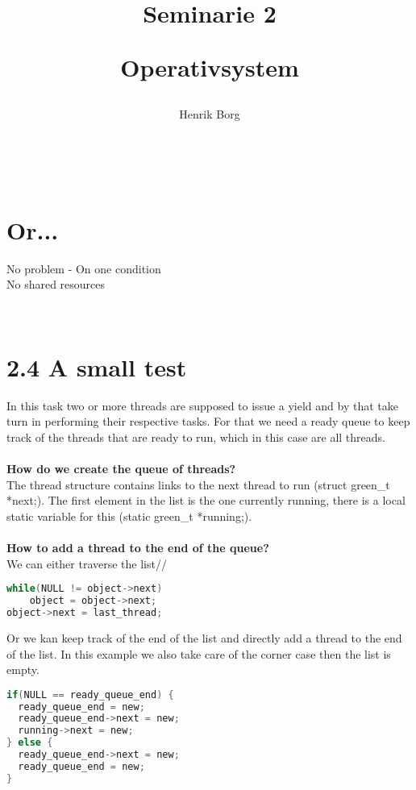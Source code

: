 \documentclass[10pt,a4paper]{article}
\title{{\HUGE Seminarie 2}\\ \begin{Large}
Operativsystem
\end{Large}}
\author{Henrik Borg}
\begin{document}
\maketitle
\begin{center}
\\[5\baselineskip]
\section*{Or...}
No problem - On one condition\\
No shared resources\\
\end{center}

\pagebreak\\


\section*{2.4 A small test}
In this task two or more threads are supposed to issue a yield and by that take turn in performing their respective tasks. For that we need a ready queue to keep track of the threads that are ready to run, which in this case are all threads.\\
\\
\textbf{How do we create the queue of threads?}\\
The thread structure contains links to the next thread to run (struct green_t *next;). The first element in the list is the one currently running, there is a local static variable for this (static green_t *running;).\\
\\
\textbf{How to add a thread to the end of the queue?}\\
We can either traverse the list//
\begin{lstlisting}[language=C]
while(NULL != object->next)
	object = object->next;
object->next = last_thread;
\end{lstlisting}
Or we kan keep track of the end of the list and directly add a thread to the end of the list. In this example we also take care of the corner case then the list is empty.
\begin{lstlisting}[language=C]
if(NULL == ready_queue_end) {
  ready_queue_end = new;
  ready_queue_end->next = new;
  running->next = new;
} else {
  ready_queue_end->next = new;
  ready_queue_end = new;
}
\end{lstlisting}
\\
\\
\end{document}
